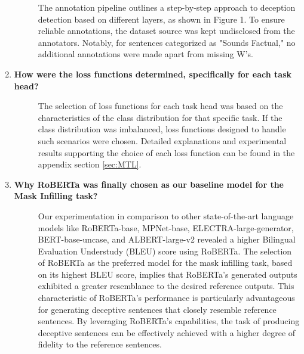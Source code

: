 \begin{enumerate}
    \vspace{-3mm}
    \begin{description}
    \item[] The annotation pipeline outlines a step-by-step approach to deception detection based on different layers, as shown in Figure 1. To ensure reliable annotations, the dataset source was kept undisclosed from the annotators. 
    Notably, for sentences categorized as "Sounds Factual," no additional annotations were made apart from missing W's.
    \end{description}



    \item[\ding{93}] { \selectfont \textbf{How were the loss functions determined, specifically for each task head?}}

    \vspace{-3mm}
    \begin{description}
    \item[] The selection of loss functions for each task head was based on the characteristics of the class distribution for that specific task. If the class distribution was imbalanced, loss functions designed to handle such scenarios were chosen. Detailed explanations and experimental results supporting the choice of each loss function can be found in the appendix section \ref{sec:MTL}.
    \end{description}

    \item[\ding{93}] { \selectfont \textbf{Why RoBERTa was finally chosen as our baseline model for the Mask Infilling task?}}

    \vspace{-3mm}
    \begin{description}
    \item[] Our experimentation in comparison to other state-of-the-art language models like RoBERTa-base, MPNet-base, ELECTRA-large-generator, BERT-base-uncase, and ALBERT-large-v2 revealed a higher Bilingual Evaluation Understudy (BLEU) score using RoBERTa. The selection of RoBERTa as the preferred model for the mask infilling task, based on its highest BLEU score, implies that RoBERTa's generated outputs exhibited a greater resemblance to the desired reference outputs. This characteristic of RoBERTa's performance is particularly advantageous for generating deceptive sentences that closely resemble reference sentences. By leveraging RoBERTa's capabilities, the task of producing deceptive sentences can be effectively achieved with a higher degree of fidelity to the reference sentences.
    \end{description}
    

\end{enumerate}
